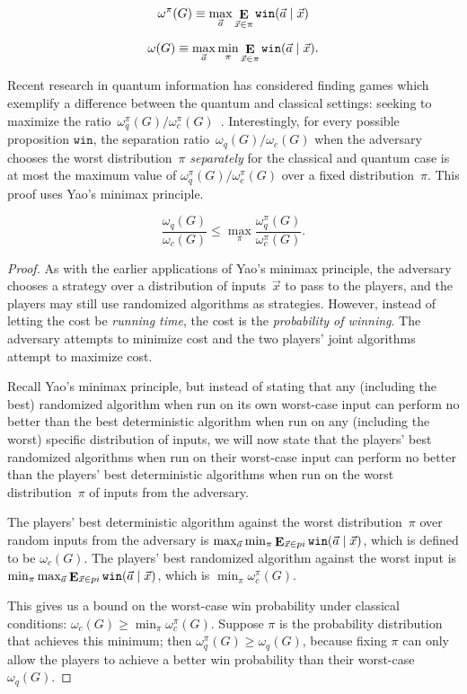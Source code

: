$$\omega^\pi(G) \equiv \max_{\vec{a}} \mathop{\mathbf{E}}_{\vec{x} \in \pi} \texttt{win}(\vec{a}\nobreak\mid\nobreak\vec{x})$$

$$\omega(G) \equiv \max_{\vec{a}} \min_\pi \mathop{\mathbf{E}}_{\vec{x} \in \pi} \texttt{win}(\vec{a}\nobreak\mid\nobreak\vec{x}).$$

Recent research in quantum information has considered finding games which exemplify a difference between the quantum and classical settings: seeking to maximize the ratio~$\omega_q^\pi(G) / \omega_c^\pi(G)$~\cite{ABBSSV}. Interestingly, for every possible proposition $\texttt{win}$, the separation ratio~$\omega_q(G) / \omega_c(G)$ when the adversary chooses the worst distribution~$\pi$ \emph{separately} for the classical and quantum case is at most the maximum value of $\omega_q^\pi(G) / \omega_c^\pi(G)$ over a fixed distribution~$\pi$. This proof uses Yao's minimax principle.

\begin{theorem}
	$$\frac{\omega_q(G)}{\omega_c(G)} \leq \max_\pi \frac{\omega_q^\pi(G)}{\omega_c^\pi(G)}.$$
\end{theorem}

\begin{proof}

As with the earlier applications of Yao's minimax principle, the adversary chooses a strategy over a distribution of inputs~$\vec{x}$ to pass to the players, and the players may still use randomized algorithms as strategies. However, instead of letting the cost be \emph{running time}, the cost is the \emph{probability of winning}. The adversary attempts to minimize cost and the two players' joint algorithms attempt to maximize cost. 

Recall Yao's minimax principle, but instead of stating that any (including the best) randomized algorithm when run on its own worst-case input can perform no better than the best deterministic algorithm when run on any (including the worst) specific distribution of inputs, we will now state that the players' best randomized algorithms when run on their worst-case input can perform no better than the players' best deterministic algorithms when run on the worst distribution~$\pi$ of inputs from the adversary. 

The players' best deterministic algorithm against the worst distribution~$\pi$ over random inputs from the adversary is $\max_{\vec{a}} \min_{\pi} \mathop{\mathbf{E}}_{\vec{x} \in pi} \texttt{win}(\vec{a}\nobreak\mid\nobreak\vec{x})$, which is defined to be $\omega_c(G)$. The players' best randomized algorithm against the worst input is $\min_\pi \max_{\vec{a}} \mathop{\mathbf{E}}_{\vec{x} \in pi} \texttt{win}(\vec{a}\nobreak\mid\nobreak\vec{x})$, which is $\displaystyle\min_\pi \omega^\pi_c(G)$.

This gives us a bound on the worst-case win probability under classical conditions: $\omega_c(G) \geq \min_{\pi} \omega_c^\pi(G)$. Suppose $\pi$ is the probability distribution that achieves this minimum; then $\omega_q^\pi(G) \geq \omega_q(G)$, because fixing $\pi$ can only allow the players to achieve a better win probability than their worst-case $\omega_q(G)$.
\end{proof}

